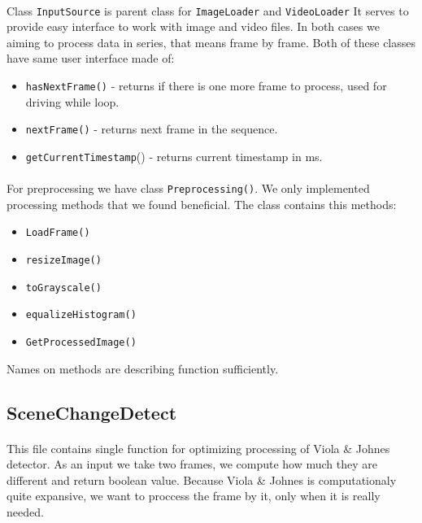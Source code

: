 \documentclass[english]{article}
\begin{document}
		\paragraph{}
			Class \texttt{InputSource} is parent class for \texttt{ImageLoader}
			and \texttt{VideoLoader} It serves to provide easy interface to work with image and video files.
			In both cases we aiming to process data in series, that means frame by frame. 
			Both of these classes have same user interface made of:
			\begin{itemize}
				\item \texttt{hasNextFrame()} - returns if there is one more frame to process, used for driving while loop.
				\item \texttt{nextFrame()} - returns next frame in the sequence.
				\item \texttt{getCurrentTimestamp}() - returns current timestamp in ms.
			\end{itemize}
		\paragraph{}
			For preprocessing we have class \texttt{Preprocessing()}. We only implemented processing methods that we found 
			beneficial. The class contains this methods:
			\begin{itemize}
				\item \texttt{LoadFrame()}
				\item \texttt{resizeImage()}
				\item \texttt{toGrayscale()}
				\item \texttt{equalizeHistogram()}
				\item \texttt{GetProcessedImage()}
			\end{itemize}
			Names on methods are describing function sufficiently.

	\subsection{SceneChangeDetect} \label{optimizer}
		\paragraph{}
			This file contains single function for optimizing processing of Viola \& Johnes detector.
			As an input we take two frames, we compute how much they are different and return boolean value.
			Because Viola \& Johnes is computationaly quite expansive, we want to proccess the frame by it, only when it is really 
			needed.
			
\end{document}
